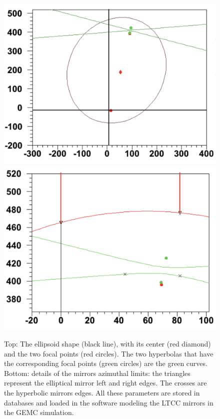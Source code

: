 \begin{figure}
	\centering
	\includegraphics[width=0.95\columnwidth,keepaspectratio]{img/mirrorMath1.png}
	\includegraphics[width=0.95\columnwidth,keepaspectratio]{img/mirrorMath2.png}
	\caption{Top: The ellipsoid shape (black line), with its center (red diamond) and the two focal points (red circles). The two hyperbolas
			   that have the corresponding focal points (green circles) are the green curves. Bottom: details of the mirrors azimuthal limits: the triangles represent
            the elliptical mirror left and right edges. The crosses are the hyperbolic mirrors edges. All these parameters are stored in databases and
            loaded in the software modeling the LTCC mirrors in the GEMC simulation.}
	\label{fig:mirrorMath}
\end{figure}

